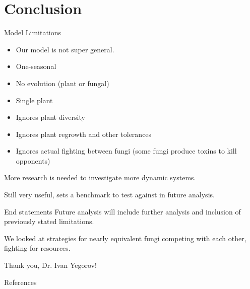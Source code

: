 \documentclass{beamer}
\begin{document}
\section{Conclusion}
\begin{frame}{Model Limitations}
    \begin{itemize}
        \item Our model is not super general.
        \item One-seasonal
        \item No evolution (plant or fungal)
        \item Single plant
        \item Ignores plant diversity 
        \item Ignores plant regrowth and other tolerances
        \item Ignores actual fighting between fungi (some fungi produce toxins to kill opponents)
    \end{itemize}
    
    More research is needed to investigate more dynamic systems.\newline
    
    Still very useful, sets a benchmark to test against in future analysis.
\end{frame}


\begin{frame}{End statements}
    Future analysis will include further analysis and inclusion of previously stated limitations.\newline
    
    We looked at strategies for nearly equivalent fungi competing with each other, fighting for resources. \newline
    
    Thank you, Dr. Ivan Yegorov!
    
\end{frame}

\begin{frame}{References}
    
    
\end{frame}
\end{document}
